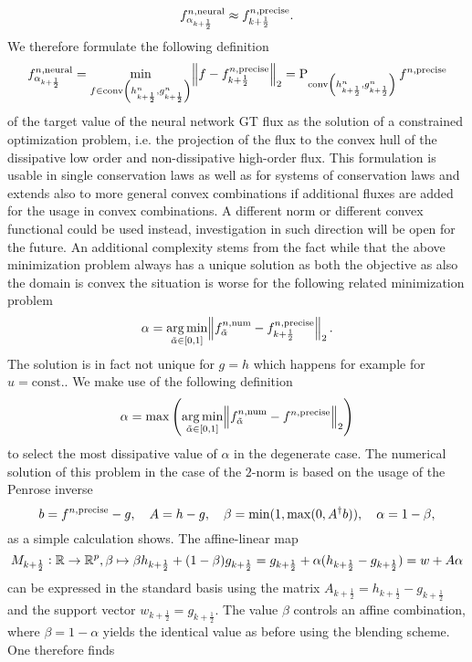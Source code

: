 \[
	f^{n, \mathrm{neural}}_{\alpha_{k + \frac 1 2}} \approx f^{n,\mathrm{precise}}_{k+\frac 1 2}.
\]
We therefore formulate the following definition
\[
	f^{n, \mathrm{neural}}_{\alpha_{k + \frac 1 2}} = \min_{f \in \operatorname{conv}\left (h^n_{k+\frac 1 2}, g^n_{k+\frac 1 2} \right) }\norm{f - f^{n,\mathrm{precise}}_{k+\frac 1 2}}_2 = \operatorname{P}_{\operatorname{conv}\left (h^n_{k+\frac 1 2}, g^n_{k+\frac 1 2} \right) }f^{n,\mathrm{precise}}
\]
of the target value of the neural network GT flux as the solution of a constrained optimization problem, i.e. the projection of the flux to the convex hull of the dissipative low order and non-dissipative high-order flux. This formulation is usable in single conservation laws as well as for systems of conservation laws and extends also to more general convex combinations if additional fluxes are added for the usage in convex combinations. A different norm or different convex functional could be used instead, investigation in such direction will be open for the future.
 An additional complexity stems from the fact while that the above minimization problem always has a unique solution as both the objective as also the domain is convex the situation is worse for the following related minimization problem
\[
	\alpha = \operatorname*{arg\,min}_{\tilde \alpha \in [0, 1]} \norm{f^{n, \mathrm{num}}_{\tilde\alpha} - f^{n,\mathrm{precise}}_{k+\frac 1 2}}_2.
\]
The solution is in fact not unique for $g = h$ which happens for example for $u = \mathrm{const.}$. We  make use of the following definition 
\[
	\alpha = \max\left ( \operatorname*{arg\,min}_{\tilde \alpha \in [0, 1]} \norm{f^{n, \mathrm{num}}_{\tilde\alpha} - f^{n,\mathrm{precise}}}_2 \right)
\]
to select the most dissipative value of $\alpha$ in the degenerate case. The numerical solution of this problem in the case of the $2$-norm is based on the usage of the Penrose inverse 
\[
	b = f^{n,\mathrm{precise}} - g, \quad A = h-g, \quad \beta = \min(1, \max(0, A^\dagger b)), \quad \alpha = 1- \beta,
\]
as a simple calculation shows. 
The affine-linear map \[M_{k+\frac 1 2}: \mathbb{R} \to \mathbb{R}^p, \beta \mapsto \beta h_{k+\frac 1 2} + (1-\beta) g_{k+\frac 1 2} = g_{k+\frac 1 2} + \alpha (h_{k+\frac 1 2} - g_{k+\frac 1 2}) = w + A\alpha\] can be expressed in the standard basis using the matrix $A_{k+\frac 1 2} = h_{k+\frac 1 2} - g_{k+\frac 1 2}$ and the support vector $w_{k+\frac 1 2} = g_{k+\frac 1 2}$. The value $\beta$ controls an affine combination, where $\beta = 1- \alpha$ yields the identical value as before using the blending scheme. One therefore finds 
